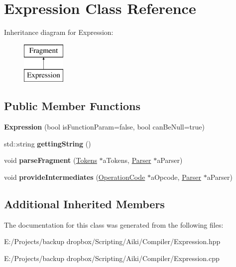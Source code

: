 \hypertarget{a00007}{\section{Expression Class Reference}
\label{a00007}
}
Inheritance diagram for Expression\+:\begin{figure}[H]
\begin{center}
\leavevmode
\includegraphics[height=2.000000cm]{de/d5e/a00007}
\end{center}
\end{figure}
\subsection*{Public Member Functions}
\begin{DoxyCompactItemize}
\item 
\hypertarget{a00007_ae3a029c39533808a1c57335628fceed2}{{\bfseries Expression} (bool is\+Function\+Param=false, bool can\+Be\+Null=true)}\label{a00007_ae3a029c39533808a1c57335628fceed2}

\item 
\hypertarget{a00007_a2aad347a1cf9634df14a6bbf8455eb2f}{std\+::string {\bfseries getting\+String} ()}\label{a00007_a2aad347a1cf9634df14a6bbf8455eb2f}

\item 
\hypertarget{a00007_aba5197ed15bc64f8b8d2cb5bca80a96f}{void {\bfseries parse\+Fragment} (\hyperlink{a00026}{Tokens} $\ast$a\+Tokens, \hyperlink{a00017}{Parser} $\ast$a\+Parser)}\label{a00007_aba5197ed15bc64f8b8d2cb5bca80a96f}

\item 
\hypertarget{a00007_a2c210728bcca2511ce480daab2e4842b}{void {\bfseries provide\+Intermediates} (\hyperlink{a00015}{Operation\+Code} $\ast$a\+Opcode, \hyperlink{a00017}{Parser} $\ast$a\+Parser)}\label{a00007_a2c210728bcca2511ce480daab2e4842b}

\end{DoxyCompactItemize}
\subsection*{Additional Inherited Members}


The documentation for this class was generated from the following files\+:\begin{DoxyCompactItemize}
\item 
E\+:/\+Projects/backup dropbox/\+Scripting/\+Aiki/\+Compiler/Expression.\+hpp\item 
E\+:/\+Projects/backup dropbox/\+Scripting/\+Aiki/\+Compiler/Expression.\+cpp\end{DoxyCompactItemize}
